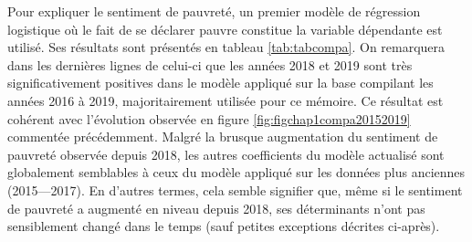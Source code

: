 \documentclass[12pt,a4paper]{reedthesis}
\begin{document}
Pour expliquer le sentiment de pauvreté, un premier modèle de régression logistique où le fait de se déclarer pauvre constitue la variable dépendante est utilisé. Ses résultats sont présentés en tableau \ref{tab:tabcompa}. On remarquera dans les dernières lignes de celui-ci que les années 2018 et 2019 sont très significativement positives dans le modèle appliqué sur la base compilant les années 2016 à 2019, majoritairement utilisée pour ce mémoire. Ce résultat est cohérent avec l'évolution observée en figure \ref{fig:figchap1compa20152019} commentée précédemment. Malgré la brusque augmentation du sentiment de pauvreté observée depuis 2018, les autres coefficients du modèle actualisé sont globalement semblables à ceux du modèle appliqué sur les données plus anciennes (2015---2017). En d'autres termes, cela semble signifier que, même si le sentiment de pauvreté a augmenté en niveau depuis 2018, ses déterminants n'ont pas sensiblement changé dans le temps (sauf petites exceptions décrites ci-après).
\end{document}
